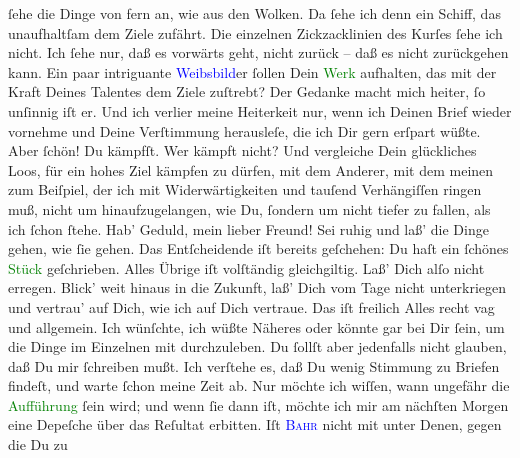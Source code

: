                ſehe die Dinge von fern an, wie aus den Wolken. Da ſehe ich denn ein Schiff, das
               unaufhaltſam dem Ziele zufährt. Die einzelnen Zickzacklinien des Kurſes ſehe ich
               nicht. Ich ſehe nur, daß es vorwärts geht, nicht zurück – daß es nicht zurückgehen
               kann. Ein paar intriguante \textcolor{blue}{Weibsbild}{}er ſollen Dein \textcolor{green}{Werk}{} aufhalten, das mit der Kraft Deines Talentes dem
               Ziele zuſtrebt? Der Gedanke macht mich heiter, ſo unſinnig iſt er. {\pb}Und ich verlier meine Heiterkeit nur, wenn ich
               Deinen Brief wieder vornehme und Deine Verſtimmung herausleſe, die ich Dir gern
               erſpart wüßte. Aber ſchön! Du kämpfſt. Wer kämpft nicht? Und vergleiche Dein
               glückliches Loos, für ein hohes Ziel kämpfen zu dürfen, mit dem Anderer, mit dem
               meinen zum Beiſpiel, der ich mit Widerwärtigkeiten und tauſend Verhängiſſen ringen
               muß, nicht um hinaufzugelangen, wie Du, ſondern um nicht tiefer zu fallen, als ich
               ſchon ſtehe. {\pb}Hab’ Geduld, mein lieber Freund! Sei
               ruhig und laß’ die Dinge gehen, wie ſie gehen. Das Entſcheidende iſt bereits
               geſchehen: Du haſt ein ſchönes \textcolor{green}{Stück}{} geſchrieben. Alles Übrige iſt volſtändig gleichgiltig.  Laß’ Dich alſo nicht erregen. Blick’ weit hinaus
               in die Zukunft, laß’ Dich vom Tage nicht unterkriegen und vertrau’ auf Dich, wie ich
               auf Dich vertraue.\pend
           \pstart
           Das iſt freilich Alles recht vag und allgemein. Ich wünſchte, ich wüßte  Näheres oder könnte gar bei Dir ſein, um {\pb}die Dinge im Einzelnen mit durchzuleben. Du ſollſt
               aber jedenfalls nicht glauben, daß Du mir ſchreiben mußt. Ich verſtehe es, daß Du
               wenig Stimmung zu Briefen findeſt, und warte ſchon meine Zeit ab. Nur möchte ich
               wiſſen, wann ungefähr die \textcolor{green}{Aufführung}{} ſein wird; und wenn ſie dann iſt, möchte ich mir am nächſten Morgen eine Depeſche über das Reſultat
               erbitten.\pend
           \pstart
           Iſt \textsc{\textcolor{blue}{Bahr}{}\ledrightnote{\textcolor{blue}{Hermann Bahr}}} nicht mit {\pb}unter Denen, gegen die Du zu
